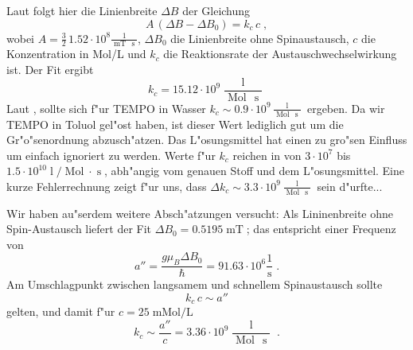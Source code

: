 \documentclass[a4paper,12pt]{article}
\newcommand{\folgt}{\ensuremath{\Rightarrow}}
\newcommand{\abs}[0]{\bigskip\noindent}
\begin{document}
Laut \cite{paper_exchange}
folgt hier
die Linienbreite $\Delta B$ der Gleichung
\begin{equation}
  \label{eq:18}
  A \, (\Delta B - \Delta B_0) = k_c \, c \;,
\end{equation}
wobei $A = \frac 3 2 \, 1.52 \cdot 10^8 \frac{1}{\operatorname{mT} \,
  \operatorname{s}}$, $\Delta B_0$ die Linienbreite ohne
Spinaustausch, $c$ die Konzentration in Mol/L und $k_c$ die
Reaktionsrate der
Austauschwechselwirkung ist.
Der Fit ergibt 
\begin{equation*}
  k_c = 15.12 \cdot 10^9  \frac{ \operatorname{l} }{\operatorname{Mol} \, \operatorname{s}}
\end{equation*}
Laut \cite{paper_exchange},  sollte sich
f"ur TEMPO in Wasser $k_c \sim 0.9 \cdot 10^9  \frac{
  \operatorname{l} }{\operatorname{Mol} \, \operatorname{s}}$
ergeben. 
Da wir TEMPO in Toluol gel"ost haben, ist dieser Wert lediglich gut um
die Gr"o"senordnung abzusch"atzen. Das L"osungsmittel hat einen zu
gro"sen Einfluss um einfach ignoriert zu werden. Werte f"ur $k_c$ reichen in \cite[Tab
1.1]{paper_exchange} von $3 \cdot 10^7$ bis $1.5 \cdot 10^{10}
\operatorname{l}/\operatorname{Mol} \cdot \operatorname{s}$, abh"angig
vom genauen Stoff und dem L"osungsmittel.
Eine kurze Fehlerrechnung zeigt f"ur uns, dass $\Delta k_c \sim 3.3 \cdot 10^9
\frac{ \operatorname{l} }{\operatorname{Mol} \, \operatorname{s}}$
sein d"urfte...


\abs
Wir haben au"serdem weitere Absch"atzungen versucht: Als Lininenbreite
ohne Spin-Austausch liefert der Fit $\Delta B_0 =
0.5195\operatorname{mT}$; das entspricht einer Frequenz von
\begin{equation*}
  a'' = \frac{ g \mu_B \Delta B_0 }{ \hbar } = 91.63 \cdot 10^6
  \frac 1 { \operatorname{s}} \;.
\end{equation*}
Am Umschlagpunkt zwischen langsamem und schnellem Spinaustausch sollte 
\begin{equation}
  \label{eq:19}
  k_c \, c \sim a''
\end{equation}
gelten, und damit f"ur $c = 25\operatorname{mMol/L}$
\begin{equation*}
  k_c \sim \frac {a''} c = 3.36 \cdot 10^9 \frac{ \operatorname{l}
  }{\operatorname{Mol} \, \operatorname{s}} \;.
\end{equation*}
\end{document}
